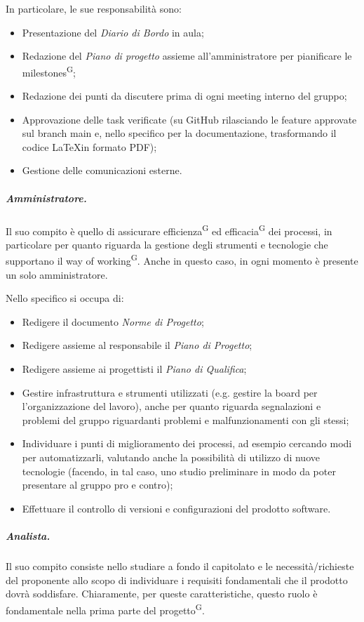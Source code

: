 In particolare, le sue responsabilità sono:
\begin{itemize}
    \item Presentazione del \textit{Diario di Bordo} in aula;
    \item Redazione del \textit{Piano di progetto} %
    assieme all'amministratore per pianificare le milestones\textsuperscript{G};
    \item Redazione dei punti da discutere prima di ogni meeting interno del gruppo;
    \item Approvazione delle task verificate (su GitHub rilasciando le feature approvate sul branch main e, nello specifico per la documentazione, trasformando il codice \LaTeX\space in formato PDF);
    \item Gestione delle comunicazioni esterne.
\end{itemize}

\subparagraph{Amministratore.}
Il suo compito è quello di assicurare efficienza\textsuperscript{G} ed efficacia\textsuperscript{G} dei processi, in particolare per quanto riguarda la gestione degli strumenti e tecnologie che supportano il way of working\textsuperscript{G}. Anche in questo caso, in ogni momento è presente un solo amministratore.

Nello specifico si occupa di:
\begin{itemize}
    \item Redigere il documento \textit{Norme di Progetto};
    \item Redigere assieme al responsabile il \textit{Piano di Progetto};
    \item Redigere assieme ai progettisti il \textit{Piano di Qualifica};
    \item Gestire infrastruttura e strumenti utilizzati (e.g. gestire la board per l'organizzazione del lavoro), anche per quanto riguarda segnalazioni e problemi del gruppo riguardanti problemi e malfunzionamenti con gli stessi;
    \item Individuare i punti di miglioramento dei processi, ad esempio cercando modi per automatizzarli, valutando anche la possibilità di utilizzo di nuove tecnologie (facendo, in tal caso, uno studio preliminare in modo da poter presentare al gruppo pro e contro);
    \item Effettuare il controllo di versioni e configurazioni del prodotto software.
\end{itemize}

\subparagraph{Analista.}
Il suo compito consiste nello studiare a fondo il capitolato e le necessità/richieste del proponente allo scopo di individuare i requisiti fondamentali che il prodotto dovrà soddisfare. Chiaramente, per queste caratteristiche, questo ruolo è fondamentale nella prima parte del progetto\textsuperscript{G}.

